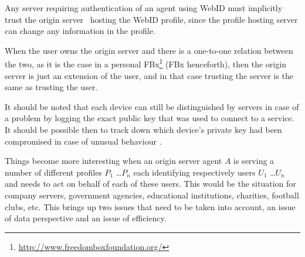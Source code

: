 \documentclass[a4paper]{llncs}
\begin{document}


Any server requiring authentication of an agent using WebID must implicitly trust the origin server~\cite{barth-a-2011--a} hosting the WebID profile, since the profile hosting server can change any information in the profile.

When the user owns the origin server and there is a one-to-one relation between the two, as it is the case in a personal FBx\footnote{\url{http://www.freedomboxfoundation.org/}} (FBx henceforth), then the origin server is just an extension of the user, and in that case trusting the server is the same as trusting the user.

It should be noted that each device can still be distinguished by servers in case of a problem by logging the exact public key that was used to connect to a service. 
It should be possible then to track down which device's private key had been compromised in case of unusual behaviour . 

Things become more interesting when an origin server agent $A$ is serving a number of different profiles $P_1$ \ldots $P_n$ each identifying respectively users $U_1$ \ldots $U_n$ and needs to act on behalf of each of these users.
This would be the situation for company servers, government agencies, educational institutions, charities, football clubs, etc.
This brings up two issues that need to be taken into account, an issue of data perspective and an issue of efficiency. 
\end{document}
